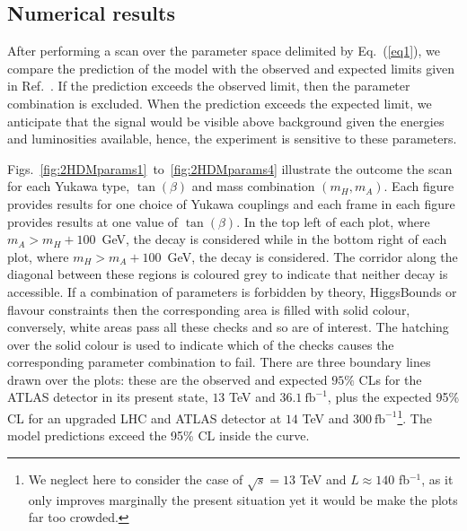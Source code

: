 \subsection{Numerical results}



After performing a scan over the parameter space delimited by Eq.~(\ref{eq1}), we compare the prediction of the model with the observed and expected limits given in Ref.~\cite{Aaboud2018AZHbbll}.
If the prediction exceeds the observed limit, then the parameter combination is excluded.
When the prediction exceeds the expected limit, we anticipate that the signal would be visible above background given the energies and luminosities available, hence,  {the experiment is sensitive to these parameters.} %


Figs.~\ref{fig:2HDMparams1}~to~\ref{fig:2HDMparams4} illustrate the outcome the scan for each
Yukawa type, \(\tan(\beta)\) and mass combination $(m_H,m_A)$.
Each figure provides results for one choice of Yukawa couplings
and each frame in each figure provides results at one value of \(\tan(\beta)\).
In the top left of each plot, where \(m_A > m_H+100\)~GeV, the decay \AZH{} is considered while 
in the bottom right of each plot, where \(m_H > m_A+100\)~GeV,   the decay \HZA{} is considered.
The corridor along the diagonal between these regions is coloured grey to indicate that neither decay is accessible.
%
If a combination of parameters is forbidden by theory, HiggsBounds or flavour constraints
then the corresponding area is filled with solid colour, conversely,
white areas pass all these checks and so are of interest. The hatching over the solid colour is used to indicate which of the checks
causes the corresponding parameter combination to fail.
There are three boundary lines drawn over the plots: 
these are the observed and expected \(95\%\) CLs for the ATLAS detector in its present state, \(13\) TeV and \(36.1~\text{fb}^{-1}\),
plus the expected 95\% CL for an upgraded LHC and ATLAS detector at \(14\) TeV and \(300~\text{fb}^{-1}\)\footnote{We neglect here to consider the case of $\sqrt s=13$ TeV and $L\approx140$ fb$^{-1}$, as it only improves marginally the present situation yet it would be make the plots far too crowded.}.
The model predictions exceed the 95\% CL inside the curve.


